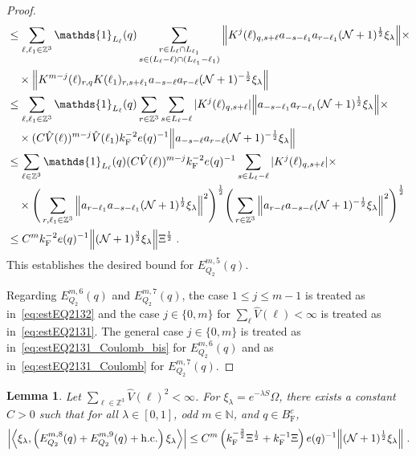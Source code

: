 \documentclass[12pt,a4paper]{article}
\numberwithin{equation}{section}
\newcommand{\NNN}{\mathbb{N}}
\newcommand{\1}{\mathbb{I}}
\newcommand{\F}{\mathrm{F}}
\newcommand{\kF}{k_\F}
\newcommand{\Zstar}{\mathbb{Z}^3} %
\newcommand{\Z}{\mathbb{Z}}
\newcommand{\NN}{\mathcal{N}}
\newcommand{\half}{\frac{1}{2}}
\newcommand{\eva}[1]{\left\langle #1 \right\rangle}
\theoremstyle{plain}
\newtheorem{lemma}[theorem]{Lemma}
\theoremstyle{definition}
\theoremstyle{remark}
\theoremstyle{plain}
\theoremstyle{definition}
\theoremstyle{remark}
\begin{document}
\begin{proof}
\begin{align}
	&\leq \sum_{\ell,\ell_1 \in \Zstar} \mathds{1}_{L_\ell}(q) \sum\limits_{\substack{r\in L_{\ell} \cap L_{\ell_1}\\ s \in (L_{\ell} - \ell) \cap (L_{\ell_1} - \ell_1)}}
		\norm{ K^{j}(\ell)_{q,s+\ell} a_{-s-\ell_1} a_{r-\ell_1} (\NN+1)^{\half} \xi_\lambda} \nonumber \times \\ 
	&\quad \times \norm{ K^{m-j}(\ell)_{r,q} K(\ell_1)_{r,s+\ell_1} a_{-s-\ell}a_{r-\ell} (\NN+1)^{-\half} \xi_\lambda } \nonumber\\
	&\leq \sum_{\ell,\ell_1 \in \Zstar} \mathds{1}_{L_\ell}(q)
		\sum_{r\in \Z^3} \sum_{s \in L_{\ell} - \ell}
		|K^{j}(\ell)_{q,s+\ell}|
		\norm{ a_{-s-\ell_1} a_{r-\ell_1} (\NN+1)^{\half} \xi_\lambda} \times \nonumber\\
	&\quad \times (C \hat{V}(\ell))^{m-j} \hat{V}(\ell_1) \kF^{-2} e(q)^{-1}
		\norm{ a_{-s-\ell}a_{r-\ell} (\NN+1)^{-\half} \xi_\lambda } \nonumber\\
	&\leq \sum_{\ell \in \Zstar} \mathds{1}_{L_\ell}(q) (C \hat{V}(\ell))^{m-j} \kF^{-2} e(q)^{-1}
		\sum_{s \in L_{\ell} - \ell}
		|K^{j}(\ell)_{q,s+\ell}| \times \nonumber\\
	&\quad \times \Bigg( \sum_{r,\ell_1 \in \Z^3} \norm{a_{r-\ell_1} a_{-s-\ell_1} (\NN+1)^{\half} \xi_\lambda}^2 \Bigg)^{\half}
		\Bigg( \sum_{r \in \Z^3} \norm{a_{r-\ell} a_{-s-\ell} (\NN+1)^{-\half} \xi_\lambda }^2 \Bigg)^{\half} \nonumber\\
	&\leq C^m \kF^{-2} e(q)^{-1}
		\norm{(\NN+1)^{\frac 32} \xi_\lambda} \Xi^{\half} \;. \label{eq:estEQ2132}
\end{align} 
This establishes the desired bound for $ E^{m,5}_{Q_2}(q) $.

Regarding $ E^{m,6}_{Q_2}(q) $ and $ E^{m,7}_{Q_2}(q) $, the case $ 1 \le j \le m-1 $ is treated as in~\eqref{eq:estEQ2132} and the case $ j \in \{0,m\} $ for $ \sum_\ell \hat{V}(\ell) < \infty $ is treated as in~\eqref{eq:estEQ2131}. The general case $ j \in \{0,m\} $ is treated as in~\eqref{eq:estEQ2131_Coulomb_bis} for $ E^{m,6}_{Q_2}(q) $ and as in~\eqref{eq:estEQ2131_Coulomb} for $ E^{m,7}_{Q_2}(q) $. 
\end{proof}


\begin{lemma} \label{lem:EQ218}
Let $ \sum_{\ell \in \Zstar} \hat{V}(\ell)^2 < \infty $. For $\xi_\lambda = e^{-\lambda S} \Omega$, there exists a constant $ C > 0 $ such that for all $ \lambda \in [0,1] $, odd $ m \in \NNN $, and $ q \in B_{\F}^c $,
\begin{align}
	\abs{\eva{\xi_\lambda,\left(E^{m,8}_{Q_2}(q) + E^{m,9}_{Q_2}(q) + \mathrm{h.c.}\right) \xi_\lambda }}
	\leq C^m \left( \kF^{-\frac 32} \Xi^\half
		+ \kF^{-1} \Xi \right)
		e(q)^{-1} \norm{(\NN+1)^{\half} \xi_\lambda} \;.\label{eq:estEQ218}
\end{align}
\end{lemma}
\end{document}
